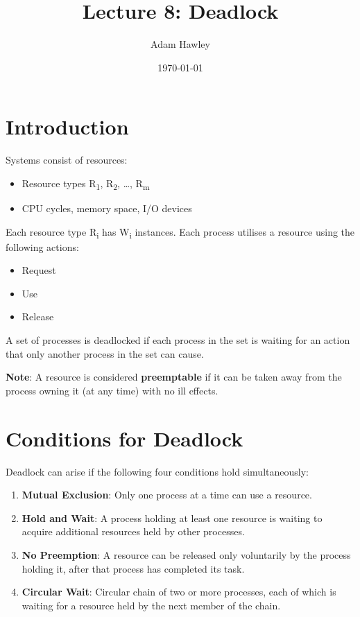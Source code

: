 \documentclass[11pt]{article}
\author{Adam Hawley}
\date{\today}
\title{Lecture 8: Deadlock}
\begin{document}
\maketitle
\tableofcontents


\section{Introduction}
\label{sec:org56b1e3d}
Systems consist of resources:
\begin{itemize}
\item Resource types R\textsubscript{1}, R\textsubscript{2}, \ldots{}, R\textsubscript{m}
\item CPU cycles, memory space, I/O devices
\end{itemize}
Each resource type R\textsubscript{i} has W\textsubscript{i} instances.
Each process utilises a resource using the following actions:
\begin{itemize}
\item Request
\item Use
\item Release
\end{itemize}
A set of processes is deadlocked if each process in the set is waiting for an action that only another process in the set can cause.

\textbf{Note}: A resource is considered \textbf{preemptable} if it can be taken away from the process owning it (at any time) with no ill effects.

\section{Conditions for Deadlock}
\label{sec:org1b9ae0b}
Deadlock can arise if the following four conditions hold simultaneously:
\begin{enumerate}
\item \textbf{Mutual Exclusion}: Only one process at a time can use a resource.
\item \textbf{Hold and Wait}: A process holding at least one resource is waiting to acquire additional resources held by other processes.
\item \textbf{No Preemption}: A resource can be released only voluntarily by the process holding it, after that process has completed its task.
\item \textbf{Circular Wait}: Circular chain of two or more processes, each of which is waiting for a resource held by the next member of the chain.
\end{enumerate}
\end{document}
